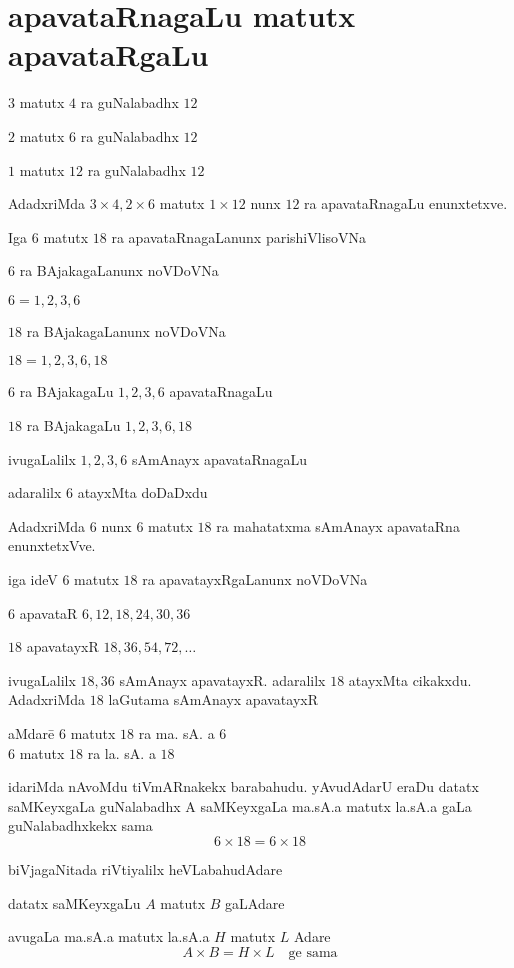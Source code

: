 \chapter{apavataRnagaLu matutx apavataRgaLu}

$3$ matutx $4$ ra guNalabadhx $12$

$2$ matutx $6$ ra guNalabadhx $12$

$1$ matutx $12$ ra guNalabadhx $12$

AdadxriMda $3\times4, 2\times 6 $ matutx $1\times 12$ nunx $12$ ra apavataRnagaLu enunxtetxve.

Iga $6$ matutx $18$ ra apavataRnagaLanunx parishiVlisoVNa 

$6$ ra BAjakagaLanunx noVDoVNa

$6=1,2,3,6$ 

$18$ ra BAjakagaLanunx noVDoVNa

$18=1,2,3,6,18$

$6$ ra BAjakagaLu $1,2,3,6$ \qquad apavataRnagaLu

$18$ ra BAjakagaLu $1,2,3,6,18$

ivugaLalilx $1,2,3,6$ sAmAnayx apavataRnagaLu 

adaralilx $6$ atayxMta doDaDxdu

AdadxriMda $6$ nunx $6$ matutx $18$ ra mahatatxma sAmAnayx apavataRna enunxtetxVve. 

iga ideV $6$ matutx $18$ ra apavatayxRgaLanunx noVDoVNa 

$6$ apavataR $6,12,18,24,30,36$

$18$ apavatayxR $18,36,54,72,\ldots$

ivugaLalilx $18, 36$ sAmAnayx apavatayxR. adaralilx $18$ atayxMta cikakxdu. AdadxriMda $18$ laGutama sAmAnayx apavatayxR

\begin{tabbing}
aMdare\qquad \= $6$ matutx $18$ ra ma. sA. a $6$\\
\> $6$ matutx $18$ ra la. sA. a $18$
\end{tabbing}
idariMda nAvoMdu tiVmARnakekx barabahudu. yAvudAdarU eraDu datatx saMKeyxgaLa guNalabadhx A saMKeyxgaLa ma.sA.a matutx la.sA.a gaLa guNalabadhxkekx sama
$$
6\times 18 = 6 \times 18
$$

biVjagaNitada riVtiyalilx heVLabahudAdare

datatx saMKeyxgaLu $A$ matutx $B$ gaLAdare

avugaLa ma.sA.a matutx la.sA.a  $H$ matutx $L$ Adare
$$
A\times B = H\times L \quad \text{ge sama}
$$

